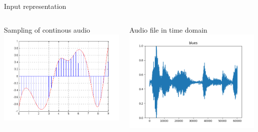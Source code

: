 \documentclass[aspectratio=169]{beamer}
\begin{document}
	\begin{frame}{Input representation}
		\begin{columns}[T]
		    \begin{column}{.5\textwidth}
		    	\begin{block}{Sampling of continous audio}
					\includegraphics[width=\textwidth]{images/signal_sampling.png}
		   		\end{block}
		    \end{column}
		    \begin{column}{.5\textwidth}
		    	\begin{block}{Audio file in time domain}
		    		\includegraphics[width=\textwidth]{images/cat_blues.png}
		    	\end{block}
		    \end{column}
		  \end{columns}
	\end{frame}
\end{document}
